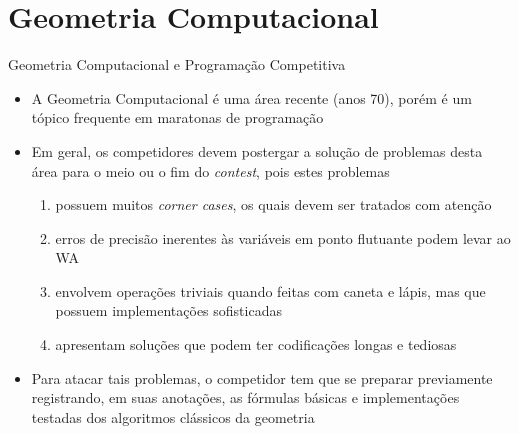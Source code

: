 \section{Geometria Computacional}

\begin{frame}[fragile]{Geometria Computacional e Programação Competitiva}

    \begin{itemize}
        \item A Geometria Computacional é uma área recente (anos 70), porém é um tópico frequente em maratonas de programação

        \item Em geral, os competidores devem postergar a solução de problemas desta área para o meio ou o fim do \textit{contest}, pois estes problemas

        \begin{enumerate}
            \item possuem muitos \textit{corner cases}, os quais devem ser tratados com atenção
            \item erros de precisão inerentes às variáveis em ponto flutuante podem levar ao WA
            \item envolvem operações triviais quando feitas com caneta e lápis, mas que possuem implementações sofisticadas
            \item apresentam soluções que podem ter codificações longas e tediosas
        \end{enumerate}

        \item Para atacar tais problemas, o competidor tem que se preparar previamente registrando, em suas anotações, as fórmulas básicas e implementações testadas dos algoritmos clássicos da geometria
    \end{itemize}

\end{frame}

